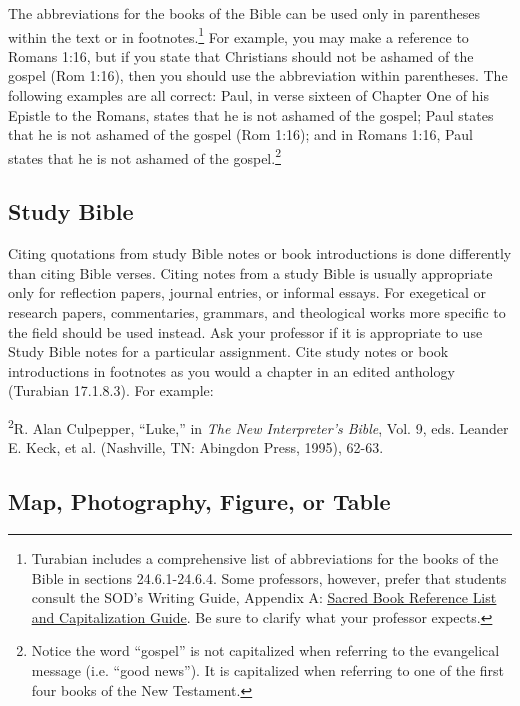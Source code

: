 \documentclass[raggedright]{turabian-researchpaper}
\newcommand*{\bluehref}[2]{\href{#1}{\color{blue}\ul{#2}}}
\begin{document}
The abbreviations for the books of the Bible can be used only in parentheses
within the text or in footnotes.\footnote{Turabian includes a comprehensive list
of abbreviations for the books of the Bible in sections 24.6.1-24.6.4. Some
professors, however, prefer that students consult the SOD's Writing Guide,
Appendix A:
\bluehref{http://www.liberty.edu/media/1162/2015_writingguide/SoD_Writing_Guide_081215.docx}{Sacred
Book Reference List and Capitalization Guide}. Be sure to clarify what your
professor expects.} For example, you may make a reference to Romans 1:16, but if
you state that Christians should not be ashamed of the gospel (Rom 1:16), then
you should use the abbreviation within parentheses. The following examples are
all correct: Paul, in verse sixteen of Chapter One of his Epistle to the Romans,
states that he is not ashamed of the gospel; Paul states that he is not ashamed
of the gospel (Rom 1:16); and in Romans 1:16, Paul states that he is not ashamed
of the gospel.\footnote{Notice the word ``gospel'' is not capitalized when
referring to the evangelical message (i.e. ``good news''). It is capitalized
when referring to one of the first four books of the New Testament.}

\subsection{Study Bible}

Citing quotations from study Bible notes or book introductions is done
differently than citing Bible verses. Citing notes from a study Bible is usually
appropriate only for reflection papers, journal entries, or informal essays. For
exegetical or research papers, commentaries, grammars, and theological works
more specific to the field should be used instead. Ask your professor if it is
appropriate to use Study Bible notes for a particular assignment. Cite study
notes or book introductions in footnotes as you would a chapter in an edited
anthology (Turabian 17.1.8.3). For example:

\begin{singlespace}
\textsuperscript{2}R. Alan Culpepper, ``Luke,'' in \textit{The New Interpreter's
Bible}, Vol. 9, eds. Leander E. Keck, et al. (Nashville, TN: Abingdon Press,
1995), 62-63.
\end{singlespace}

\subsection{Map, Photography, Figure, or Table}
\end{document}
